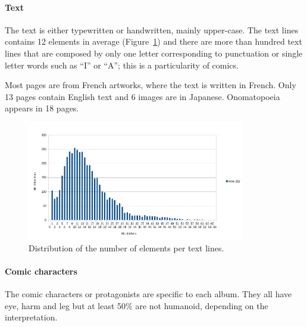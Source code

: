 
\paragraph{Text} %
\label{par:text}
The text is either typewritten or handwritten, mainly upper-case. %
The text lines contains 12 elements in average (Figure~\ref{fig:ex:textline_lenth_distribution}) and there are more than hundred text lines that are composed by only one letter corresponding to punctuation or single letter words such as ``I'' or ``A''; this is a particularity of comics.

Most pages are from French artworks, where the text is written in French.
Only 13 pages contain English text and 6 images are in Japanese.
Onomatopoeia appears in 18 pages.

    \begin{figure}[ht]%
      \centering
      \includegraphics[trim= 0px 5px 65px 5px, clip, width=0.85\textwidth]{number_of_letter_per_textline.png}
      \caption[Distribution of the number of elements per text lines]{Distribution of the number of elements per text lines.
      }
      \label{fig:ex:textline_lenth_distribution}
    \end{figure}  


\paragraph{Comic characters} %
\label{par:comic_characters}
The comic characters or protagonists are specific to each album.
They all have eye, harm and leg but at least 50\% are not humanoid, depending on the interpretation.

